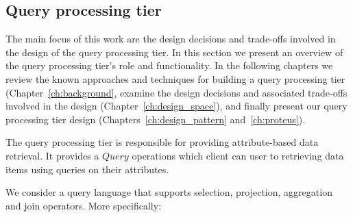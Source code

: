 \subsection{Query processing tier}
\label{subsec:query_prcessing_tier}
Τhe main focus of this work are the design decisions and trade-offs involved in the design of the query processing tier.
In this section we present an overview of the query processing tier's role and functionality.
In the following chapters we review the known approaches and techniques for building a query processing tier (Chapter~\ref{ch:background},
examine the design decisions and associated trade-offs involved in the design (Chapter~\ref{ch:design_space}),
and finally present our query processing tier design (Chapters~\ref{ch:design_pattern} and~\ref{ch:proteus}).

\medskip
\noindent
The query processing tier is responsible for providing attribute-based data retrieval.
It provides a $Query$ operations which client can user to retrieving data items using queries on their attributes.

We consider a query language that supports selection, projection, aggregation and join operators.
More specifically:

